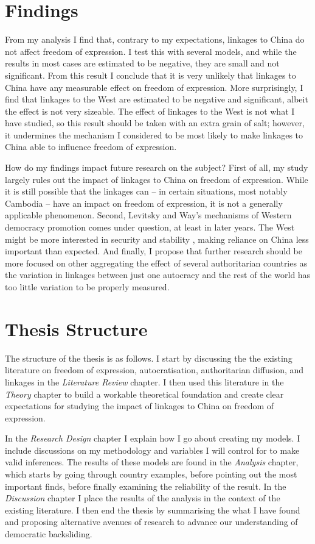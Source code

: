 \section{Findings}
From my analysis I find that, contrary to my expectations, linkages to China do not affect freedom of expression. I test this with several models, and while the results in most cases are estimated to be negative, they are small and not significant. From this result I conclude that it is very unlikely that linkages to China have any measurable effect on freedom of expression. More surprisingly, I find that linkages to the West are estimated to be negative and significant, albeit the effect is not very sizeable. The effect of linkages to the West is not what I have studied, so this result should be taken with an extra grain of salt; however, it undermines the mechanism I considered to be most likely to make linkages to China able to influence freedom of expression.

How do my findings impact future research on the subject? First of all, my study largely rules out the impact of linkages to China on freedom of expression. While it is still possible that the linkages can -- in certain situations, most notably Cambodia -- have an impact on freedom of expression, it is not a generally applicable phenomenon. Second, Levitsky and Way's \citeyear{levitsky_linkage_2006} mechanisms of Western democracy promotion comes under question, at least in later years. The West might be more interested in security and stability \citep{borzel_noble_2015, delcour_spoiler_2015, freyburg_local_2015}, making reliance on China less important than expected. And finally, I propose that further research should be more focused on other aggregating the effect of several authoritarian countries as the variation in linkages between just one autocracy and the rest of the world has too little variation to be properly measured.

\section{Thesis Structure}
The structure of the thesis is as follows. I start by discussing the the existing literature on freedom of expression, autocratisation, authoritarian diffusion, and linkages in the \textit{Literature Review} chapter. I then used this literature in the \textit{Theory} chapter to build a workable theoretical foundation and create clear expectations for studying the impact of linkages to China on freedom of expression.

In the \textit{Research Design} chapter I explain how I go about creating my models. I include discussions on my methodology and variables I will control for to make valid inferences. The results of these models are found in the \textit{Analysis} chapter, which starts by going through country examples, before pointing out the most important finds, before finally examining the reliability of the result. In the \textit{Discussion} chapter I place the results of the analysis in the context of the existing literature. I then end the thesis by summarising the what I have found and proposing alternative avenues of research to advance our understanding of democratic backsliding.
